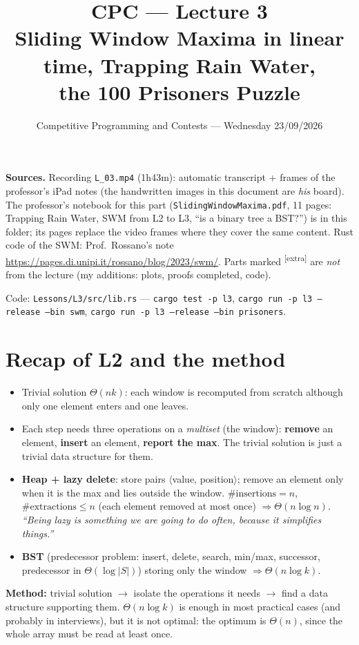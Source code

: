 \documentclass[11pt,a4paper]{article}
\title{\textbf{CPC --- Lecture 3}\\[2pt]\large Sliding Window Maxima in linear time, Trapping Rain Water,\\ the 100 Prisoners Puzzle}
\author{Competitive Programming and Contests --- Wednesday 23/09/2026}
\date{}
\theoremstyle{definition}\newtheorem*{definition}{Definition}
\newcommand{\extra}{\textsuperscript{\textcolor{warn}{[extra]}}}
\begin{document}
\maketitle
\vspace{-1.5em}
\begin{keybox}
\textbf{Sources.} Recording \texttt{L\_03.mp4} (1h43m): automatic transcript + frames of the professor's
iPad notes (the handwritten images in this document are \emph{his} board).
The professor's notebook for this part (\texttt{SlidingWindowMaxima.pdf}, 11 pages: Trapping Rain Water, SWM from L2 to L3,
``is a binary tree a BST?'') is in this folder; its pages replace the video frames where they cover the same content.
Rust code of the SWM: Prof.\ Rossano's note \url{https://pages.di.unipi.it/rossano/blog/2023/swm/}.
Parts marked \extra{} are \emph{not} from the lecture (my additions: plots, proofs completed, code).
\end{keybox}

\noindent Code: \texttt{Lessons/L3/src/lib.rs} --- \texttt{cargo test -p l3},
\texttt{cargo run -p l3 --release --bin swm}, \texttt{cargo run -p l3 --release --bin prisoners}.

\tableofcontents

\section{Recap of L2 and the method}
\begin{itemize}[nosep]
\item Trivial solution $\Theta(nk)$: each window is recomputed from scratch although only one element enters and one leaves.
\item Each step needs three operations on a \emph{multiset} (the window): \textbf{remove} an element, \textbf{insert} an element, \textbf{report the max}.
      The trivial solution is just a trivial data structure for them.
\item \textbf{Heap + lazy delete}: store pairs $\langle$value, position$\rangle$; remove an element only when it is the max and lies outside the window.
      $\#\text{insertions}=n$, $\#\text{extractions}\le n$ (each element removed at most once) $\Rightarrow \Theta(n\log n)$.
      \emph{``Being lazy is something we are going to do often, because it simplifies things.''}
\item \textbf{BST} (predecessor problem: insert, delete, search, min/max, successor, predecessor in $\Theta(\log|S|)$) storing only the window $\Rightarrow \Theta(n\log k)$.
\end{itemize}
\begin{keybox}
\textbf{Method:} trivial solution $\to$ isolate the operations it needs $\to$ find a data structure supporting them.
$\Theta(n\log k)$ is enough in most practical cases (and probably in interviews), but it is not optimal: the optimum is $\Theta(n)$,
since the whole array must be read at least once.
\end{keybox}
\end{document}

